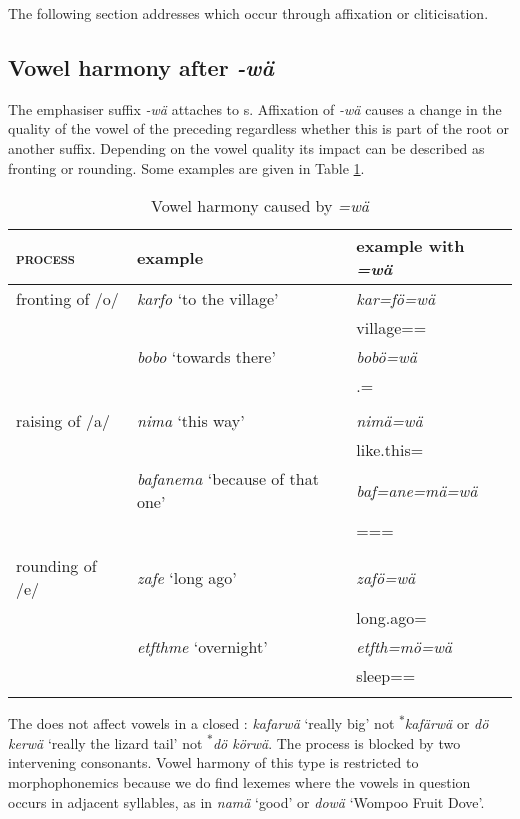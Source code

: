 The following section addresses  which occur through affixation or cliticisation.

\subsection{Vowel harmony after \emph{-wä}} \label{vowharmwae}

The emphasiser suffix \emph{-wä} attaches to s. Affixation of \emph{-wä} causes a change in the quality of the vowel of the preceding  regardless whether this  is part of the root or another suffix. Depending on the vowel quality its impact can be described as fronting or rounding. Some examples are given in Table \ref{vowelharmwae}.

\begin{table}
\caption{Vowel harmony caused by \emph{=wä}}
\label{vowelharmwae}
	\begin{tabular}{lll}
		\lsptoprule
		\textsc{process}&{example}& {example with} \emph{=wä} \\ \midrule
		fronting of /o/&\emph{karfo} `to the village' & \emph{kar=fö=wä} \\
		&&village=\Abl{}=\Emph{}\\
		&\emph{bobo} `towards there' & \emph{bobö=wä}\\
		&&\Med{}.\All{}=\Emph{}\\
		&&\\
		raising of /a/&\emph{nima} `this way' & \emph{nimä=wä}\\
		&&like.this=\Emph{}\\
		&\emph{bafanema} `because of that one' & \emph{baf=ane=mä=wä}\\
		&&\Recog=\Poss=\Char=\Emph{}\\
		&&\\
		rounding of /e/&\emph{zafe} `long ago' & \emph{zafö=wä}\\
		&&long.ago=\Emph\\
		&\emph{etfthme} `overnight' & \emph{etfth=mö=wä}\\
		&&sleep=\Ins=\Emph\\
		\lspbottomrule
	\end{tabular}
\end{table}	%

The  does not affect vowels in a closed : \emph{kafarwä} `really big' not \textsuperscript{$\ast$}\emph{kafärwä} or \emph{dö kerwä} `really the lizard tail' not \textsuperscript{$\ast$}\emph{dö körwä}. The process is blocked by two intervening consonants. Vowel harmony of this type is restricted to morphophonemics because we do find lexemes where the vowels in question occurs in adjacent syllables, as in \emph{namä} `good' or \emph{dowä} `Wompoo Fruit Dove'.

